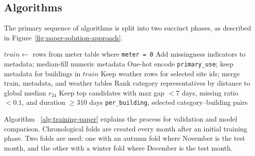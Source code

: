\documentclass[conference]{IEEEtran}
\begin{document}
\subsection{Algorithms}

The primary sequence of algorithms is split into two succinct phases, as described in Figure~\ref{fig:paper-solution-approach}.


\begin{algorithm}[H]
\scriptsize
\DontPrintSemicolon
\caption{Preprocessing and building selection}
\label{alg:prep-selection-paper}
$train \leftarrow$ rows from meter table where \texttt{meter = 0}\;
Add missingness indicators to metadata; median-fill numeric metadata\;
One-hot encode \texttt{primary\_use}; keep metadata for buildings in $train$\;
Keep weather rows for selected site ids; merge train, metadata, and weather tables\;
Rank category representatives by distance to global median $r_{24}$\;
Keep top candidates with max gap $<7$ days, missing ratio $<0.1$, and duration $\ge310$ days\;
\Return \texttt{per\_building}, selected category--building pairs\;
\end{algorithm}

Algorithm ~\ref{alg:training-paper} explains the process for validation and model comparison.
Chronological folds are created every month after an initial training
phase. Two folds are used: one with an autumn fold where November is
the test month, and the other with a winter fold where December is
the test month.
\end{document}
